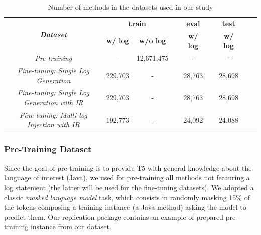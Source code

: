 \begin{table}[h]
	\centering
	\scriptsize
	\caption{Number of methods in the datasets used in our study\vspace{-0.3cm}}
		\label{tab:ds-summary-1}
	\begin{tabular}{ccccccccc}
		\toprule
		\multirow{2}{*}{\textit{\textbf{Dataset}}} & \multicolumn{2}{c}{\textbf{train}} & \textbf{} & \textbf{eval} & \textbf{} & \textbf{test}  \\ \cline{2-3} \cline{5-5} \cline{7-7} 
		& \textbf{w/ log} & \textbf{w/o log} & \textbf{} & \textbf{w/ log} & \textbf{} & \textbf{w/ log} \\ \midrule
		\textit{Pre-training}              & -               &      12,671,475  &           & -               &           &  -               \\
		\textit{Fine-tuning: Single Log Generation}               & 229,703         & -                &           & 28,763          &           & 28,698          \\
		\textit{Fine-tuning: Single Log Generation with IR}               & 229,703         & -                &           & 28,763          &           & 28,698          \\
		\textit{Fine-tuning: Multi-log Injection with IR}               & 192,773         & -                &           & 24,092         &           & 24,088          \\
		\bottomrule
	\end{tabular}
	\vspace{-0.3cm}
\end{table}

\subsubsection{Pre-Training Dataset}
\label{sub:pretraining}
Since the goal of pre-training is to provide T5 with general knowledge about the language of interest (\ie Java), we used for pre-training all methods not featuring a log statement (the latter will be used for the fine-tuning datasets). We adopted a classic \emph{masked language model} task, which consists in randomly masking 15\% of the tokens composing a training instance (\ie a Java method) asking the model to predict them. 
Our replication package \cite{replication} contains an example of prepared pre-training instance from our dataset.





